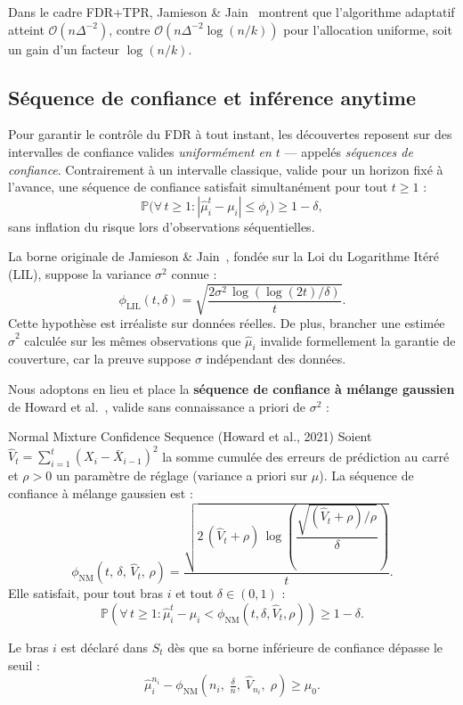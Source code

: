 \documentclass[11pt,a4paper]{article}
\newcommand{\calO}{\mathcal{O}}
\newcommand{\Prob}{\mathbb{P}}
\newcommand{\muhat}{\hat{\mu}}
\newcommand{\sigsq}{\sigma^2}
\newcommand{\phil}{\phi_{\mathrm{LIL}}}
\newcommand{\phinm}{\phi_{\mathrm{NM}}}
\begin{document}
Dans le cadre FDR+TPR, Jamieson \& Jain~\cite{jamieson2019}
montrent que l'algorithme adaptatif atteint $\calO(n\Delta^{-2})$,
contre $\calO(n\Delta^{-2}\log(n/k))$ pour l'allocation uniforme,
soit un gain d'un facteur $\log(n/k)$.

\subsection{Séquence de confiance et inférence anytime}

Pour garantir le contrôle du FDR à tout instant, les découvertes reposent
sur des intervalles de confiance valides \emph{uniformément en $t$} ---
appelés \emph{séquences de confiance}. Contrairement à un intervalle
classique, valide pour un horizon fixé à l'avance, une séquence de
confiance satisfait simultanément pour tout $t \geq 1$ :
\[
  \Prob\!\bigl(\forall\, t \geq 1 : |\muhat_i^t - \mu_i| \leq \phi_t\bigr) \geq 1 - \delta,
\]
sans inflation du risque lors d'observations séquentielles.

La borne originale de Jamieson \& Jain~\cite{jamieson2019}, fondée sur la
Loi du Logarithme Itéré (LIL), suppose la variance $\sigsq$ connue :
\[
  \phil(t, \delta) = \sqrt{\frac{2\sigsq\,\log(\log(2t)/\delta)}{t}}.
\]
Cette hypothèse est irréaliste sur données réelles. De plus, brancher
une estimée $\hat{\sigma}^2$ calculée sur les mêmes observations que
$\muhat_i$ invalide formellement la garantie de couverture, car
la preuve suppose $\sigma$ indépendant des données.

Nous adoptons en lieu et place la \textbf{séquence de confiance à
mélange gaussien} de Howard et al.~\cite{howard2021}, valide sans
connaissance a priori de $\sigsq$ :

\begin{definition}{Normal Mixture Confidence Sequence (Howard et al., 2021)}{}
Soient $\hat{V}_t = \sum_{i=1}^{t}(X_i - \bar{X}_{i-1})^2$ la somme
cumulée des erreurs de prédiction au carré et $\rho > 0$ un paramètre
de réglage (variance a priori sur $\mu$). La séquence de confiance
à mélange gaussien est :
\[
  \phinm(t,\,\delta,\,\hat{V}_t,\,\rho)
  = \frac{\sqrt{2\,(\hat{V}_t+\rho)\,
    \log\!\left(\dfrac{\sqrt{(\hat{V}_t+\rho)/\rho}}{\delta}\right)}}{t}.
\]
Elle satisfait, pour tout bras $i$ et tout $\delta \in (0,1)$ :
\[
  \Prob\!\left(\forall\, t \geq 1 :
    \muhat_i^t - \mu_i < \phinm(t,\delta,\hat{V}_t,\rho)
  \right) \geq 1 - \delta.
\]
\end{definition}

Le bras $i$ est déclaré dans $S_t$ dès que sa borne inférieure de confiance
dépasse le seuil :
\[
  \muhat_i^{n_i} - \phinm\!\left(n_i,\;\tfrac{\delta}{n},\;\hat{V}_{n_i},\;\rho\right) \geq \mu_0.
\]
\end{document}
